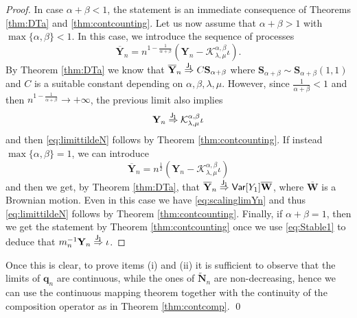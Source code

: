 \documentclass[]{amsart}
\numberwithin{equation}{section}
\theoremstyle{remark}
\theoremstyle{definition}
\begin{document}
\begin{proof}
	In case $\alpha+\beta<1$, the statement is an immediate consequence of Theorems \ref{thm:DTa} and \ref{thm:contcounting}. Let us now assume that $\alpha+\beta>1$ with $\max\{\alpha,\beta\}<1$. In this case, we introduce the sequence of processes
	\begin{equation*}
		\overline{\mathbf{Y}}_n=n^{1-\frac{1}{\alpha+\beta}}\left(\mathbf{Y}_n-\mathcal{K}^{\alpha,\beta}_{\lambda,\mu}\iota\right).	
	\end{equation*} 
	By Theorem \ref{thm:DTa} we know that $\overline{\mathbf{Y}}_n \overset{\sf J_1}{\Rightarrow}C \mathbf{S}_{\alpha+\beta}$ where $\mathbf{S}_{\alpha+\beta} \sim \mathbf{S}_{\alpha+\beta}(1,1)$ and $C$ is a suitable constant depending on $\alpha,\beta,\lambda,\mu$. However, since $\frac{1}{\alpha+\beta}<1$ and then $n^{1-\frac{1}{\alpha+\beta}} \to +\infty$, the previous limit also implies
	\begin{equation}\label{eq:scalinglimYn}
		\mathbf{Y}_n \overset{\sf J_1}{\Rightarrow} \mathcal{K}^{\alpha,\beta}_{\lambda,\mu}\iota
	\end{equation}
	and then \eqref{eq:limittildeN} follows by Theorem \ref{thm:contcounting}. If instead $\max\{\alpha,\beta\}=1$, we can introduce
	\begin{equation*}
		\overline{\mathbf{Y}}_n=n^{\frac{1}{2}}\left(\mathbf{Y}_n-\mathcal{K}^{\alpha,\beta}_{\lambda,\mu}\iota\right)	
	\end{equation*} 
	and then we get, by Theorem \ref{thm:DTa}, that $\overline{\mathbf{Y}}_n \overset{\sf J_1}{\Rightarrow}{\sf Var}[Y_1] \overline{\mathbf{W}}$, where $\overline{\mathbf{W}}$ is a Brownian motion. Even in this case we have \eqref{eq:scalinglimYn} and thus \eqref{eq:limittildeN} follows by Theorem \ref{thm:contcounting}. Finally, if $\alpha+\beta=1$, then we get the statement by Theorem \ref{thm:contcounting} once we use \eqref{eq:Stable1} to deduce that $m_n^{-1}\mathbf{Y}_n \overset{\sf J_1}{\Rightarrow} \iota$.
\end{proof}
Once this is clear, to prove items (i) and (ii) it is sufficient to observe that the limits of $\mathbf{q}_n$ are continuous, while the ones of $\widetilde{\mathbf{N}}_n$ are non-decreasing, hence we can use the continuous mapping theorem together with the continuity of the composition operator as in Theorem \ref{thm:contcomp}.
\hfill \qed
\end{document}

